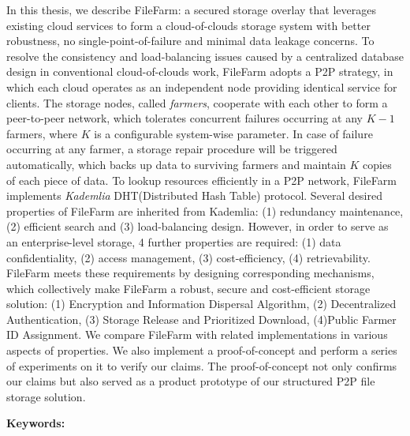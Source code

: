 \begin{abstracten}
  In this thesis, we describe FileFarm: a secured storage overlay that leverages existing cloud services to form a cloud-of-clouds storage system with better robustness, no single-point-of-failure and minimal data leakage concerns. To resolve the consistency and load-balancing issues caused by a centralized database design in conventional cloud-of-clouds work, FileFarm adopts a P2P strategy, in which each cloud operates as an independent node providing identical service for clients. The storage nodes, called \textit{farmers}, cooperate with each other to form a peer-to-peer network, which tolerates concurrent failures occurring at any $K-1$ farmers, where $K$ is a configurable system-wise parameter. In case of failure occurring at any farmer, a storage repair procedure will be triggered automatically, which backs up data to surviving farmers and maintain $K$ copies of each piece of data. To lookup resources efficiently in a P2P network, FileFarm implements \textit{Kademlia} DHT(Distributed Hash Table) protocol\cite{maymounkov2002kademlia}. Several desired properties of FileFarm are inherited from Kademlia: (1) redundancy maintenance, (2) efficient search and (3) load-balancing design. However, in order to serve as an enterprise-level storage, 4 further properties are required: (1) data confidentiality, (2) access management, (3) cost-efficiency, (4) retrievability. FileFarm meets these requirements by designing corresponding mechanisms, which collectively  make FileFarm a robust, secure and cost-efficient storage solution: (1) Encryption and Information Dispersal Algorithm, (2) Decentralized Authentication, (3) Storage Release and Prioritized Download, (4)Public Farmer ID Assignment. We compare FileFarm with related implementations in various aspects of properties. We also implement a proof-of-concept and perform a series of experiments on it to verify our claims.  The proof-of-concept not only confirms our claims but also served as a product prototype of our structured P2P file storage solution.

\bigbreak
\noindent \textbf{Keywords:}{\, \makeatletter \@keywordsen \makeatother}
\end{abstracten}
